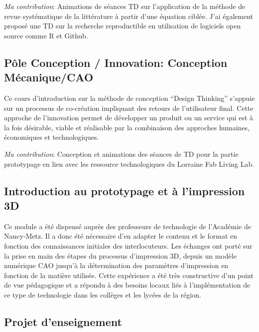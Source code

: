 \documentclass[
  11pt,
]{article}
\begin{document}
\emph{Ma contribution}: Animations de séances TD sur l'application de la
méthode de revue systématique de la littérature à partir d'une équation
ciblée. J'ai également proposé une TD sur la recherche reproductible en
utilisation de logiciels open source comme R et Github.

\hypertarget{puxf4le-conception-innovation-conception-muxe9caniquecao}{%
\subsection{Pôle Conception / Innovation: Conception
Mécanique/CAO}\label{puxf4le-conception-innovation-conception-muxe9caniquecao}}

Ce cours d'introduction sur la méthode de conception ``Design Thinking''
s'appuie sur un processus de co-création impliquant des retours de
l'utilisateur final. Cette approche de l'innovation permet de développer
un produit ou un service qui est à la fois désirable, viable et
réalisable par la combinaison des approches humaines, économiques et
technologiques.

\emph{Ma contribution}: Conception et animations des séances de TD pour
la partie prototypage en lien avec les ressource technologiques du
Lorraine Fab Living Lab.

\hypertarget{introduction-au-prototypage-et-uxe0-limpression-3d}{%
\subsection{Introduction au prototypage et à l'impression
3D}\label{introduction-au-prototypage-et-uxe0-limpression-3d}}

Ce module a été dispensé auprès des professeurs de technologie de
l'Académie de Nancy-Metz. Il a donc été nécessaire d'en adapter le
contenu et le format en fonction des connaissances initiales des
interlocuteurs. Les échanges ont porté sur la prise en main des étapes
du processus d'impression 3D, depuis un modèle numérique CAO jusqu'à la
détermination des paramètres d'impression en fonction de la matière
utilisée. Cette expérience a été très constructive d'un point de vue
pédagogique et a répondu à des besoins locaux liés à l'implémentation de
ce type de technologie dans les collèges et les lycées de la région.

\hypertarget{projet-denseignement}{%
\subsection{Projet d'enseignement}\label{projet-denseignement}}
\end{document}
